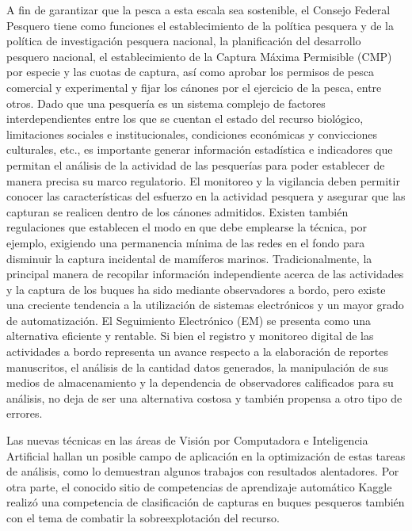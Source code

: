 \documentclass[11pt]{charter}
\begin{document}
\vspace{25px}

A fin de garantizar que la pesca a esta escala sea sostenible, el Consejo Federal Pesquero tiene como funciones el establecimiento de la política pesquera y de la política de investigación pesquera nacional, la planificación del desarrollo pesquero nacional, el establecimiento de la Captura Máxima Permisible (CMP) por especie y las cuotas de captura, así como aprobar los permisos de pesca comercial y experimental y fijar los cánones por el ejercicio de la pesca, entre otros. 
Dado que una pesquería es un sistema complejo de factores interdependientes entre los que se cuentan el estado del recurso biológico, limitaciones sociales e institucionales, condiciones económicas y convicciones culturales, etc., es importante generar información estadística e indicadores que permitan el análisis de la actividad de las pesquerías para poder establecer de manera precisa su marco regulatorio.
El monitoreo y la vigilancia deben permitir conocer las características del esfuerzo en la actividad pesquera y asegurar que las capturan se realicen dentro de los cánones admitidos. Existen también regulaciones que establecen el modo en que debe emplearse la técnica, por ejemplo, exigiendo una permanencia mínima de las redes en el fondo para disminuir la captura incidental de mamíferos marinos.
Tradicionalmente, la principal manera de recopilar información independiente acerca de las actividades y la captura de los buques ha sido mediante observadores a bordo, pero existe una creciente tendencia a la utilización de sistemas electrónicos y un mayor grado de automatización.
El Seguimiento Electrónico (EM) se presenta como una alternativa eficiente y rentable.
Si bien el registro y monitoreo digital de las actividades a bordo representa un avance respecto a la elaboración de reportes manuscritos, el análisis de la cantidad datos generados, la manipulación de sus medios de almacenamiento y la dependencia de observadores calificados para su análisis, no deja de ser una alternativa costosa y también propensa a otro tipo de errores.

Las nuevas técnicas en las áreas de Visión por Computadora e Inteligencia Artificial hallan un posible campo de aplicación en la optimización de estas tareas de análisis, como lo demuestran algunos trabajos con resultados alentadores. Por otra parte, el conocido sitio de competencias de aprendizaje automático Kaggle realizó una competencia de clasificación de capturas en buques pesqueros también con el tema de  combatir la sobreexplotación del recurso.
\end{document}
